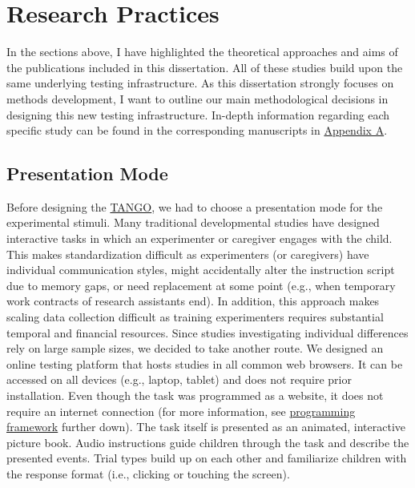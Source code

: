 \documentclass[
]{scrbook}
\begin{document}
\section{Research Practices}\label{approach-practices}

In the sections above, I have highlighted the theoretical approaches and aims of the publications included in this dissertation. All of these studies build upon the same underlying testing infrastructure. As this dissertation strongly focuses on methods development, I want to outline our main methodological decisions in designing this new testing infrastructure. In-depth information regarding each specific study can be found in the corresponding manuscripts in \hyperref[appendixA]{Appendix A}.

\subsection{Presentation Mode}\label{approach-presentation}

Before designing the \hyperref[acronyms_TANGO]{TANGO}, we had to choose a presentation mode for the experimental stimuli. Many traditional developmental studies have designed interactive tasks in which an experimenter or caregiver engages with the child. This makes standardization difficult as experimenters (or caregivers) have individual communication styles, might accidentally alter the instruction script due to memory gaps, or need replacement at some point (e.g., when temporary work contracts of research assistants end). In addition, this approach makes scaling data collection difficult as training experimenters requires substantial temporal and financial resources. Since studies investigating individual differences rely on large sample sizes, we decided to take another route. We designed an online testing platform that hosts studies in all common web browsers. It can be accessed on all devices (e.g., laptop, tablet) and does not require prior installation. Even though the task was programmed as a website, it does not require an internet connection (for more information, see \hyperref[approach-programming]{programming framework} further down). The task itself is presented as an animated, interactive picture book. Audio instructions guide children through the task and describe the presented events. Trial types build up on each other and familiarize children with the response format (i.e., clicking or touching the screen).
\end{document}
